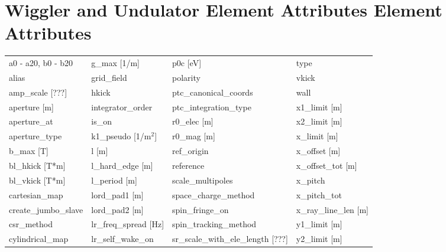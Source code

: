 \section{Wiggler and Undulator Element Attributes Element Attributes}
 \label{s:list.wiggler}
 
 \begin{tabular}{llll} \toprule
a0 - a20, b0 - b20             & g_max [1/m]                    & p0c [eV]                       & type                           \\
alias                          & grid_field                     & polarity                       & vkick                          \\
amp_scale [???]                & hkick                          & ptc_canonical_coords           & wall                           \\
aperture [m]                   & integrator_order               & ptc_integration_type           & x1_limit [m]                   \\
aperture_at                    & is_on                          & r0_elec [m]                    & x2_limit [m]                   \\
aperture_type                  & k1_pseudo [1/m$^2$]            & r0_mag [m]                     & x_limit [m]                    \\
b_max [T]                      & l [m]                          & ref_origin                     & x_offset [m]                   \\
bl_hkick [T*m]                 & l_hard_edge [m]                & reference                      & x_offset_tot [m]               \\
bl_vkick [T*m]                 & l_period [m]                   & scale_multipoles               & x_pitch                        \\
cartesian_map                  & lord_pad1 [m]                  & space_charge_method            & x_pitch_tot                    \\
create_jumbo_slave             & lord_pad2 [m]                  & spin_fringe_on                 & x_ray_line_len [m]             \\
csr_method                     & lr_freq_spread [Hz]            & spin_tracking_method           & y1_limit [m]                   \\
cylindrical_map                & lr_self_wake_on                & sr_scale_with_ele_length [???] & y2_limit [m]                   \\

\end{tabular}

